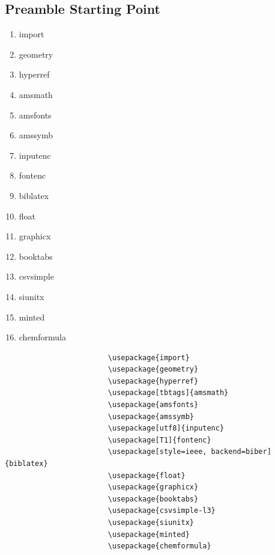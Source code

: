\documentclass[titlepage, hidelinks, 12pt]{article}%
\begin{document}
        \subsection{Preamble Starting Point}
                \begin{minipage}{0.4\linewidth}%
                    \begin{enumerate}
                        \item import
                        \item geometry
                        \item hyperref
                        \item amsmath
                        \item amsfonts
                        \item amssymb
                        \item inputenc
                        \item fontenc
                        \item biblatex
                        \item float
                        \item graphicx
                        \item booktabs
                        \item csvsimple
                        \item siunitx
                        \item minted
                        \item chemformula
                    \end{enumerate}
                \end{minipage}
                \begin{minipage}{0.6\linewidth}%
                    \begin{verbatim}
                        \usepackage{import}
                        \usepackage{geometry}
                        \usepackage{hyperref}
                        \usepackage[tbtags]{amsmath}
                        \usepackage{amsfonts}
                        \usepackage{amssymb}
                        \usepackage[utf8]{inputenc}
                        \usepackage[T1]{fontenc}
                        \usepackage[style=ieee, backend=biber]{biblatex}
                        \usepackage{float}
                        \usepackage{graphicx}
                        \usepackage{booktabs}
                        \usepackage{csvsimple-l3}
                        \usepackage{siunitx}
                        \usepackage{minted}
                        \usepackage{chemformula}
                    \end{verbatim}
                \end{minipage}
\end{document}
